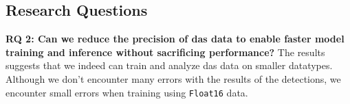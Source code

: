 \subsection{Research Questions}

\textbf{RQ 2: Can we reduce the precision of \acrshort{das} data to enable faster model training and inference without sacrificing performance?} The results suggests that we indeed can train and analyze \acrshort{das} data on smaller datatypes. Although we don't encounter many errors with the results of the detections, we encounter small errors when training using \texttt{Float16} data. \\
